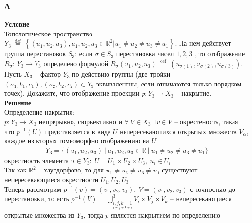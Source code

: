 			\subsubsection*{\textbf{А}}
			\textbf{Условие}\\
			Топологическое пространство $Y_{3} \stackrel{\text { def }}{=}\left\{\left(u_{1}, u_{2}, u_{3}\right), u_{1}, u_{2}, u_{3} \in \mathbb{R}^{2} | u_{1} \neq u_{2} \neq u_{3} \neq u_{1}\right\}$. На нем действует группа перестановок $S_3$: если $\sigma \in S_3$ перестановка чисел $1,2,3$ , то отображение $R_{\sigma}:\ Y_3 \to Y_3$ определено формулой $R_{\sigma}\left(u_{1}, u_{2}, u_{3}\right) \stackrel{\text { def }}{=}\left(u_{\sigma(1)}, u_{\sigma(2)}, u_{\sigma(3)}\right)$. Пусть $X_3$ -- фактор $Y_3$ по действию
			группы (две тройки $\left(a_{1}, b_{1}, c_{1}\right),\left(a_{2}, b_{2}, c_{2}\right) \in Y_{3}$ эквивалентны, если отличаются только порядком точек). Докажите, что отображение проекции $p: Y_{3} \rightarrow X_{3}$ -- накрытие.
			\\
			\textbf{Решение}\\
			Определение накрытия:\\
			$p: Y_3 \to X_3$ непрерывно, сюръективно и $\forall\ V \in X_3\ \exists v \in V$ -- окрестеность, такая что $p^{-1}(U)$ представляется в виде $U$ непересекающихся открытых множеств $V_{\alpha}$, каждое из кторых гомеоморфно отображению на $U$
			\begin{gather*}
				Y_3 = \{(u_1,u_2,u_3)\ |\ u_1,u_2,u_3 \in \mathbb{R}\ |\ u_1 \ne u_2 \ne u_3 \ne u_1\}
			\end{gather*}
			окрестность элемента $u \in Y_3:\ U = U_1 \times U_2 \times U_3,\ u_i \in U_i$\\
			Так как $\mathbb{R}^2$ -- хаусдорфово, то для $u_1 \ne u_2 \ne u_3 \ne u_1$	существуют непересекающиеся окрестности $U_1,U_2,U_3$\\
			Теперь рассмотрим $p^{-1}(v)=(v_1,v_2,v_3),\ V=(v_1,v_2,v_3)$ с точностью до перестановки, то есть $p^{-1}(V) = \bigcup\limits^{3}_{\underset{i \ne j \ne k\ne i}{i,j,k = 1}} V_i \times V_j \times V_k$ -- непересекающиеся открытые множества из $Y_3$, тогда $p$ является накрытием по определению\\

